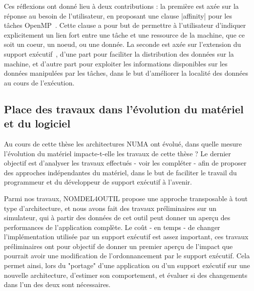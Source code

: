 Ces réflexions ont donné lieu à deux contributions : la première est axée sur la réponse au besoin de l'utilisateur, en proposant une clause |affinity| pour les tâches OpenMP~\cite{Virouleau2016b}.
Cette clause a pour but de permettre à l'utilisateur d'indiquer explicitement un lien fort entre une tâche et une ressource de la machine, que ce soit un coeur, un noeud, ou une donnée.
La seconde est axée sur l'extension du support exécutif~\cite{Virouleau2016a}, d'une part pour faciliter la distribution des données sur la machine, et d'autre part pour exploiter les informations disponibles sur les données manipulées par les tâches, dans le but d'améliorer la localité des données au cours de l'exécution.


\subsection*{Place des travaux dans l'évolution du matériel et du logiciel}

Au cours de cette thèse les architectures NUMA ont évolué, dans quelle mesure l'évolution du matériel impacte-t-elle les travaux de cette thèse ?
Le dernier objectif est d'analyser les travaux effectués - voir les compléter - afin de proposer des approches indépendantes du matériel, dans le but de faciliter le travail du programmeur et du développeur de support exécutif à l'avenir.

Parmi nos travaux, NOMDEL4OUTIL propose une approche transposable à tout type d'architecture, et nous avons fait des travaux préliminaires sur un simulateur, qui à partir des données de cet outil peut donner un aperçu des performances de l'application complète.
Le coût - en temps - de changer l'implémentation utilisée par un support exécutif est assez important, ces travaux préliminaires ont pour objectif de donner un premier aperçu de l'impact que pourrait avoir une modification de l'ordonnancement par le support exécutif.
Cela permet ainsi, lors du "portage" d'une application ou d'un support exécutif sur une nouvelle architecture, d'estimer son comportement, et évaluer si des changements dans l'un des deux sont nécessaires.
